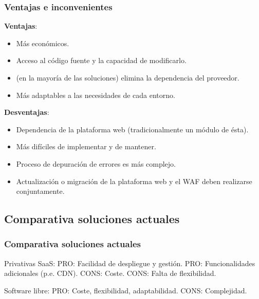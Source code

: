 \begin{frame}[shrink]
  \frametitle{Ventajas e inconvenientes}
  {\bf Ventajas}:
  \begin{itemize}
    \item Más económicos.
    \item Acceso al código fuente y la capacidad de modificarlo.
    \item (en la mayoría de las soluciones) elimina la dependencia del proveedor.
    \item Más adaptables a las necesidades de cada entorno.
  \end{itemize}
  {\bf Desventajas}:
  \begin{itemize}
    \item Dependencia de la plataforma web (tradicionalmente un módulo de ésta).
    \item Más difíciles de implementar y de mantener.
    \item Proceso de depuración de errores es más complejo.
    \item Actualización o migración de la plataforma web y el WAF deben realizarse conjuntamente.
  \end{itemize}
\end{frame}

\subsection{Comparativa soluciones actuales}
\begin{frame}[shrink]
  \frametitle{Comparativa soluciones actuales}
  Privativas SaaS:
  PRO: Facilidad de despliegue y gestión.
  PRO: Funcionalidades adicionales (p.e. CDN).
  CONS: Coste.
  CONS: Falta de flexibilidad.

  Software libre:
  PRO: Coste, flexibilidad, adaptabilidad.
  CONS: Complejidad.
\end{frame}

